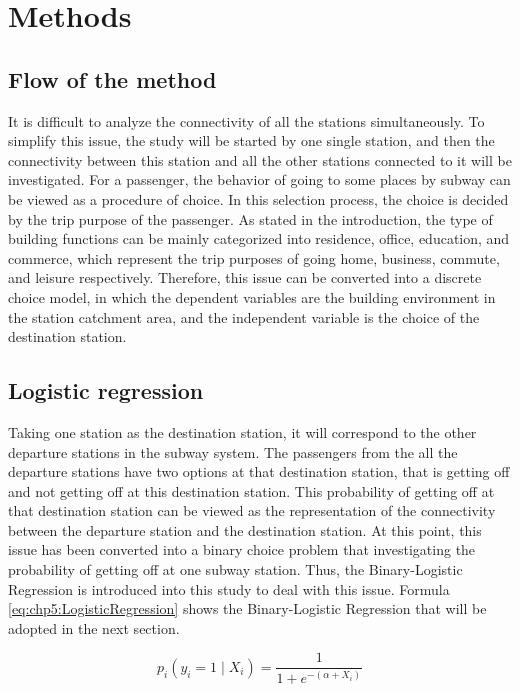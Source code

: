 %
\section{Methods}
%
\subsection{Flow of the method}
It is difficult to analyze the connectivity of all the stations simultaneously. To simplify this issue, the study will be started by one single station, and then the connectivity between this station and all the other stations connected to it will be investigated. For a passenger, the behavior of going to some places by subway can be viewed as a procedure of choice. In this selection process, the choice is decided by the trip purpose of the passenger. As stated in the introduction, the type of building functions can be mainly categorized into residence, office, education, and commerce, which represent the trip purposes of going home, business, commute, and leisure respectively. Therefore, this issue can be converted into a discrete choice model, in which the dependent variables are the building environment in the station catchment area, and the independent variable is the choice of the destination station.

%
\subsection{Logistic regression}
Taking one station as the destination station, it will correspond to the other departure stations in the subway system. The passengers from the all the departure stations have two options at that destination station, that is getting off and not getting off at this destination station. This probability of getting off at that destination station can be viewed as the representation of the connectivity between the departure station and the destination station. At this point, this issue has been converted into a binary choice problem that investigating the probability of getting off at one subway station. Thus, the Binary-Logistic Regression is introduced into this study to deal with this issue. Formula \ref{eq:chp5:LogisticRegression} shows the Binary-Logistic Regression that will be adopted in the next section.

\begin{equation}
	p_i(y_i=1 \mid X_i)=\frac{1}{1+e^{-(\alpha +X_i)}}
	\label{eq:chp5:LogisticRegression}
\end{equation}

